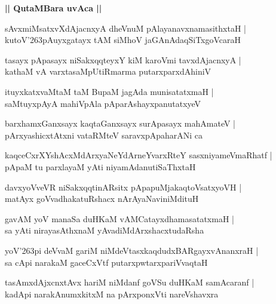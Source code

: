 \documentclass[twoside,12pt,openright]{book}
\def\S{\char'263}
\newcounter{shloka}[chapter]
\def\uvaca#1{\centerline{{\large\textbf{#1}}}}
\begin{document}
\uvaca{|| QutaMBara uvAca ||}

\begin{shloka}%
sAvxmiMsatxvXdAjacnxyA dheVnuM pAlayanavxnamasithxtaH |\\
kutoV\S pAuyxgatayx tAM siMhoV jaGAnAdaqSiTxgoVcaraH 
\end{shloka}

\begin{shloka}%
tasayx pApasayx niSakxqqteyxY kiM karoVmi tavxdAjacnxyA |\\
kathaM vA varxtasaMpUtiRmarma putarxparxdAhiniV 
\end{shloka}

\begin{shloka}%
ituyxkatxvaMtaM taM BupaM jagAda munisatatxmaH |\\
saMtuyxpAyA mahiVpAla pAparAshayxpanutatxyeV 
\end{shloka}

\begin{shloka}%
barxhamxGanxsayx kaqtaGanxsayx surApasayx mahAmateV |\\
pArxyashicxtAtxni vataRMteV saravxpApaharANi ca 
\end{shloka}

\begin{shloka}%
kaqceCxrXYshAcxMdArxyaNeYdArneYvarxRteY sasxniyameVmaRhatf |\\
pApaM tu parxlayaM yAti niyamAdanutiSaThxtaH 
\end{shloka}

\begin{shloka}%
davxyoVveVR niSakxqqtinARsitx pApapuMjakaqtoVsatxyoVH |\\
matAyx goVvadhakatuRshacx nArAyaNaviniMdituH 
\end{shloka}

\begin{shloka}%
gavAM yoV manaSa duHKaM vAMCatayxdhamasatatxmaH  |\\
sa yAti nirayasAthxnaM yAvadiMdArxshacxtudaRsha 
\end{shloka}

\begin{shloka}%
yoV\S pi deVvaM gariM niMdeVtasxkaqdudxBARgayxvAnanxraH |\\
sa cApi narakaM gaceCxVtf putarxpwtarxpariVvaqtaH 
\end{shloka}

\begin{shloka}%
tasAmxdAjxcnxtAvx hariM niMdanf goVSu duHKaM samAcaranf |\\
kadApi narakAnumxkitxM na pArxponxVti nareVshavxra
\end{shloka}
\end{document}
